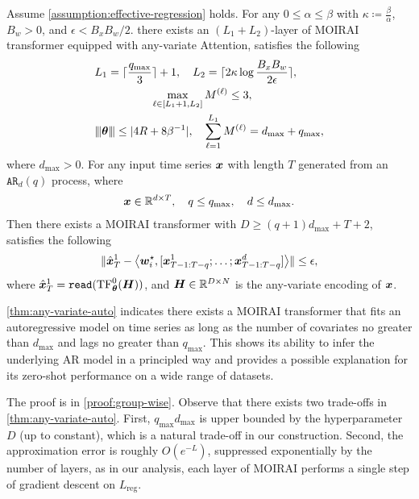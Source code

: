 \begin{theorem}\label{thm:any-variate-auto}
    Assume \cref{assumption:effective-regression} holds.
    For any $0 \leq \alpha \leq \beta$ with $\kappa \coloneqq \frac{\beta}{\alpha}$, $B_w > 0$, and $\epsilon < B_x B_w / 2$.
    there exists an $(L_1+L_2)$-layer of MOIRAI transformer equipped with any-variate Attention, satisfies the following
    \begin{align*}
        &
        L_1 = \lceil  \frac{q_{\max}}{3} \rceil  +1, \quad
        L_2 = \lceil 2 \kappa \log \frac{ B_x B_w}{2\epsilon} \rceil, 
        \quad
        \\
        &\quad\quad\quad \quad\quad\max_{\ell \in [L_1+1, L_2]} M^{(\ell)} \leq 3, 
        \\
        &{\left\vert\kern-0.25ex\left\vert\kern-0.25ex\left\vert \bm{\theta} \right\vert\kern-0.25ex\right\vert\kern-0.25ex\right\vert} \leq \lvert 4R + 8 \beta^{-1} \rvert,
        \quad \sum_{ \ell=1 }^{L_1} M^{(\ell)} = d_{\max} + q_{\max},
    \end{align*}
    where $d_{\max} > 0$.
    For any input time series $\bm{x}$ with length $T$ generated from an $\mathtt{AR}_d(q)$ process, where
    \begin{align*}
        \bm{x} \in \mathbb{R}^{d \times T},\quad q \leq q_{\max}, \quad d \leq d_{\max}.
    \end{align*}
    Then there exists a MOIRAI transformer with $D \geq (q+1)d_{\max} + T + 2$, satisfies the following
    \begin{equation}
        \lVert
        \hat{\bm{x}}_{T}^1
        -
        \left\langle
        \bm{w}^\star_i, [\bm{x}_{T-1: T-q}^1; \dots ; \bm{x}_{T-1: T-q}^d]
        \right\rangle
        \rVert
        \leq 
        \epsilon,
    \end{equation}
    where $\hat{\bm{x}}_T^1 = \mathtt{read}(\text{TF}^0_{\bm{\theta}}(\bm{H}))$, and $\bm{H} \in \mathbb{R}^{D\times  N}$ is the any-variate encoding of $\bm{x}$.
\end{theorem}
\begin{remark}
    \cref{thm:any-variate-auto} indicates there exists a MOIRAI transformer that fits an autoregressive model on time series as long as the number of covariates no greater than $d_{\max}$ and lags no greater than $q_{\max}$.
    This shows its ability to infer the underlying AR model in a principled way and provides a possible explanation for its zero-shot performance on a wide range of datasets.
\end{remark}

The proof is in \cref{proof:group-wise}.
Observe that there exists two trade-offs in \cref{thm:any-variate-auto}.
First, $q_{\max} d_{\max}$ is upper bounded by the hyperparameter $D$ (up to constant), which is a natural trade-off in our construction.
Second, the approximation error is roughly $O( e^{-L} )$, suppressed exponentially by the number of layers, as in our analysis, each layer of MOIRAI performs a single step of gradient descent on $L_{\text{reg}}$.

